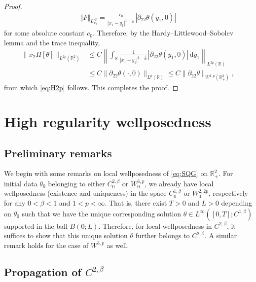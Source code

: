 \documentclass[10pt]{amsart}
\theoremstyle{definition}
\theoremstyle{remark}
\numberwithin{equation}{section}
\newcommand{\nrm}[1]{\Vert#1\Vert}
\newcommand{\ud}{\mathrm{d}}
\newcommand{\0}{\emptyset}
\newcommand{\bt}{\beta}
\newcommand{\tht}{\theta}
\newcommand{\bbR}{\mathbb R}
\begin{document}
\begin{proof}
\begin{equation*}
				\begin{split}
					\nrm{F}_{L^{2p}_{x_2}} = \frac{ c_{0} }{|x_1 - y_1|^{1 - \frac{1}{2p}}}  |\partial_{22} \tht(y_1,0)| 
				\end{split}
			\end{equation*} for some absolute constant $c_{0}$. Therefore, by the Hardy--Littlewood--Sobolev lemma and the trace inequality,  \begin{equation*}
				\begin{aligned}
					\| x_2 H[\tht] \|_{L^{2p}(\bbR^2)} & \leq C \left\| \int_{\bbR} \frac{1}{|x_1 - y_1|^{1 - \frac{1}{2p}}}  |\partial_{22} \tht(y_1,0)| \,\ud y_1 \right\|_{L^{2p}(\bbR)} \\
					&\leq C \| \partial_{22} \tht(\cdot,0) \|_{L^p(\bbR)}  \leq C\| \partial_{22} \tht \|_{W^{1,p}(\bbR^2_{+})},
				\end{aligned}
			\end{equation*} from which \eqref{eq:H2p} follows. This completes the proof.
		\end{proof}
		
		\section{High regularity wellposedness}\label{sec:lwp}
		
		
			\subsection{Preliminary remarks}\label{subsec:wellposed-rmk}
			
			We begin with some remarks on local wellposedness of \eqref{eq:SQG} on $\bbR^{2}_{+}$. For initial data $\theta_{0}$ belonging to either $C^{2,\bt}_{0}$ or $W^{3,p}_{0}$, we already have local wellposedness (existence and uniqueness) in the space $C^{1,\bt}_{0}$ or $W^{2,2p}_{0}$, respectively for any $0<\bt<1$ and $1<p<\infty$. That is, there exist $T>0$ and $L>0$ depending on $\tht_{0}$ such that we have the unique corresponding solution $\tht \in L^{\infty}([0,T]; C^{1,\bt})$ supported in the ball $B(0;L)$. Therefore, for local wellposedness in $C^{2,\bt}$, it suffices to show that this unique solution $\tht$ further belongs to $C^{2,\bt}$. A similar remark holds for the case of $W^{3,p}$ as well. 
		
		
		
		
		\subsection{Propagation of $C^{2,\bt}$}\label{sec:C2-bt}
		
\end{document}
